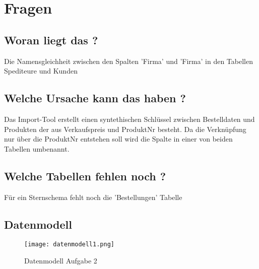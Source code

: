 \documentclass[10pt]{scrartcl}
\author{André Harms, Oliver Steenbuck}
\title{\titletext}
\date{19.11.2012}
\begin{document}
\maketitle

\setcounter{tocdepth}{3}
\tableofcontents

\section{Fragen}
\subsection{Woran liegt das ?}
Die Namensgleichheit zwischen den Spalten 'Firma' und 'Firma' in den Tabellen Spediteure und Kunden

\subsection{Welche Ursache kann das haben ?}
Das Import-Tool erstellt einen syntethischen Schlüssel zwischen Bestelldaten und Produkten der aus Verkaufspreis und ProduktNr besteht. Da die Verknüpfung nur über die ProduktNr entstehen soll wird die Spalte in einer von beiden Tabellen umbenannt.

\subsection{Welche Tabellen fehlen noch ?}
Für ein Sternschema fehlt noch die 'Bestellungen' Tabelle


\subsection{Datenmodell}
\begin{figure}[H]
\begin{turn}{0}	
	\label{pic:datenmodell}
	\texttt{[image: datenmodell1.png]}
	\caption{Datenmodell Aufgabe 2} 
\end{turn}
\end{figure}
\end{document}
